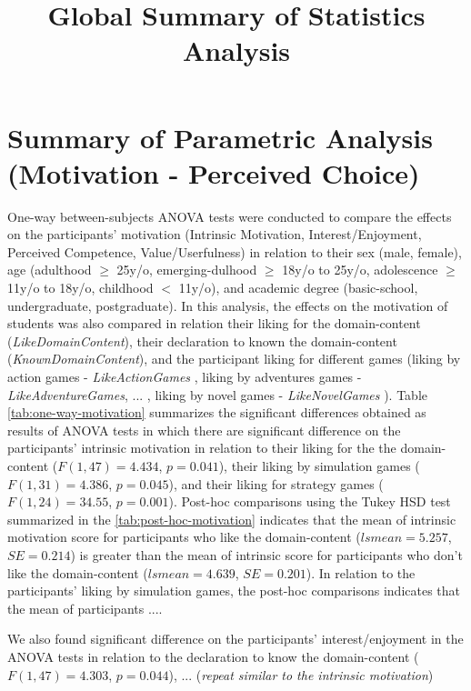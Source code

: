 \documentclass[6pt]{article}
\title{Global Summary of Statistics Analysis}
\begin{document}
\maketitle


\section{Summary of Parametric Analysis (Motivation - Perceived Choice)}

One-way between-subjects ANOVA tests were conducted to compare the effects on the participants' motivation (Intrinsic Motivation, Interest/Enjoyment, Perceived Competence, Value/Userfulness) in relation to their sex (male, female), age (adulthood  $\geq$ 25y/o, emerging-dulhood $\geq$ 18y/o to 25y/o, adolescence $\geq$ 11y/o to 18y/o, childhood $<$ 11y/o),  and academic degree (basic-school, undergraduate, postgraduate). In this analysis, the effects on the motivation of students was also compared in relation their liking for the domain-content (\emph{LikeDomainContent}), their declaration to known the domain-content (\emph{KnownDomainContent}), and the participant liking for different games (liking by action games - \emph{LikeActionGames} , liking by adventures games - \emph{LikeAdventureGames}, ... , liking by novel games - \emph{LikeNovelGames} ). Table \ref{tab:one-way-motivation} summarizes the significant differences obtained as results of ANOVA tests in which there are significant difference on the participants' intrinsic motivation in relation to their liking for the the domain-content ($F(1,47) = 4.434$, $p = 0.041$), their liking by simulation games ($F(1,31) = 4.386$, $p = 0.045$), and their liking for strategy games ($F(1,24)=34.55$, $p=0.001$). Post-hoc comparisons using the Tukey HSD test summarized in the \ref{tab:post-hoc-motivation} indicates that the mean of intrinsic motivation score for participants who like the domain-content ($lsmean=5.257$, $SE=0.214$) is greater than the mean of intrinsic score for participants who don't like the domain-content ($lsmean=4.639$, $SE=0.201$). In relation to the participants' liking by simulation games, the post-hoc comparisons indicates that the mean of participants ....

We also found significant difference on the participants' interest/enjoyment in the ANOVA tests in relation to the declaration to know the domain-content ($F(1,47) = 4.303$, $p = 0.044$),  ... (\emph{repeat similar to the intrinsic motivation})

\newpage
\end{document}
